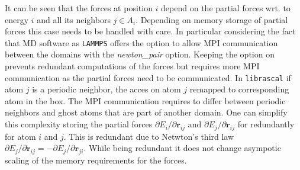 It can be seen that the forces at position $i$ depend on the partial forces wrt. to energy $i$ and all its neighbors $j\in A_i$.
Depending on memory storage of partial forces this case needs to be handled with care.
In particular considering the fact that MD software as \texttt{LAMMPS} offers the option to allow MPI communication between the domains with the \emph{newton\_pair} option.
Keeping the option on prevents redundant computations of the forces but requires more MPI communication as the partial forces need to be communicated.
In \texttt{librascal} if atom $j$ is a periodic neighbor, the acces on atom $j$ remapped to corresponding atom in the box.
The MPI communication requires to differ between periodic neighbors and ghost atoms that are part of another domain.
One can simplify this complexity storing the partial forces $\partial{E_i}/\partial{\mathbf{r}_{ij}}$ and $\partial{E_j}/\partial{\mathbf{r}_{ij}}$ for redundantly for atom $i$ and $j$.
This is redundant due to Netwton's third law $\partial{E_j}/\partial{\mathbf{r}_{ij}} = - \partial{E_j}/\partial{\mathbf{r}_{ji}}$.
While being redundant it does not change asympotic scaling of the memory requirements for the forces.

